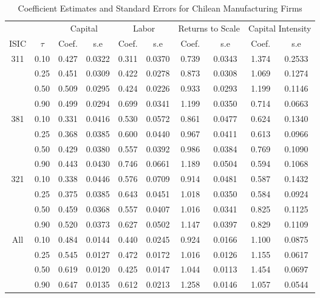 \begin{table}[ht]
\centering
\caption{Coefficient Estimates and Standard Errors for Chilean Manufacturing Firms} 
\begin{tabular}{cccccccccc}
  \hline\hline & & \multicolumn{2}{c}{Capital}  & \multicolumn{2}{c}{Labor} & \multicolumn{2}{c}{Returns to Scale} & \multicolumn{2}{c}{Capital Intensity}\\ \cmidrule(lr){3-4} \cmidrule(lr){5-6} \cmidrule(lr){7-8} \cmidrule(lr){9-10}ISIC & $\tau$ & Coef. & s.e & Coef. & s.e & Coef. & s.e & Coef. & s.e \\ 
  \hline
311 & 0.10 & 0.427 & 0.0322 & 0.311 & 0.0370 & 0.739 & 0.0343 & 1.374 & 0.2533 \\ 
   & 0.25 & 0.451 & 0.0309 & 0.422 & 0.0278 & 0.873 & 0.0308 & 1.069 & 0.1274 \\ 
   & 0.50 & 0.509 & 0.0295 & 0.424 & 0.0226 & 0.933 & 0.0293 & 1.199 & 0.1146 \\ 
   & 0.90 & 0.499 & 0.0294 & 0.699 & 0.0341 & 1.199 & 0.0350 & 0.714 & 0.0663 \\ 
  381 & 0.10 & 0.331 & 0.0416 & 0.530 & 0.0572 & 0.861 & 0.0477 & 0.624 & 0.1340 \\ 
   & 0.25 & 0.368 & 0.0385 & 0.600 & 0.0440 & 0.967 & 0.0411 & 0.613 & 0.0966 \\ 
   & 0.50 & 0.429 & 0.0380 & 0.557 & 0.0392 & 0.986 & 0.0384 & 0.769 & 0.1090 \\ 
   & 0.90 & 0.443 & 0.0430 & 0.746 & 0.0661 & 1.189 & 0.0504 & 0.594 & 0.1068 \\ 
  321 & 0.10 & 0.338 & 0.0446 & 0.576 & 0.0709 & 0.914 & 0.0481 & 0.587 & 0.1432 \\ 
   & 0.25 & 0.375 & 0.0385 & 0.643 & 0.0451 & 1.018 & 0.0350 & 0.584 & 0.0924 \\ 
   & 0.50 & 0.459 & 0.0368 & 0.557 & 0.0407 & 1.016 & 0.0341 & 0.825 & 0.1125 \\ 
   & 0.90 & 0.520 & 0.0373 & 0.627 & 0.0502 & 1.147 & 0.0397 & 0.829 & 0.1109 \\ 
  All & 0.10 & 0.484 & 0.0144 & 0.440 & 0.0245 & 0.924 & 0.0166 & 1.100 & 0.0875 \\ 
   & 0.25 & 0.545 & 0.0127 & 0.472 & 0.0172 & 1.016 & 0.0126 & 1.155 & 0.0617 \\ 
   & 0.50 & 0.619 & 0.0120 & 0.425 & 0.0147 & 1.044 & 0.0113 & 1.454 & 0.0697 \\ 
   & 0.90 & 0.647 & 0.0135 & 0.612 & 0.0213 & 1.258 & 0.0146 & 1.057 & 0.0544 \\ 
   \hline
\end{tabular}
\end{table}
